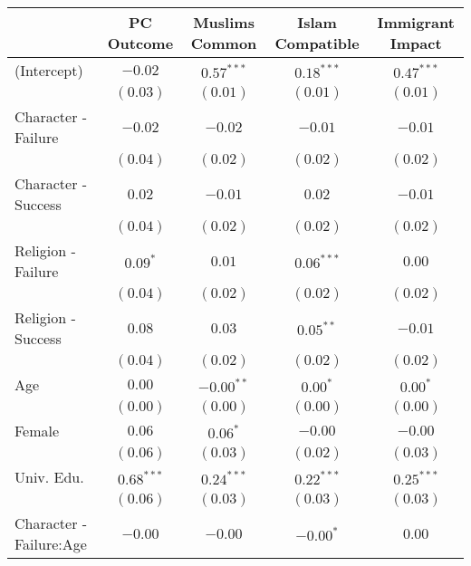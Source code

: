
\begin{table}[H]
\begin{center}
\begin{scriptsize}
\begin{tabular}{l c c c c}
\hline
 & PC Outcome & Muslims Common & Islam Compatible & Immigrant Impact \\
\hline
(Intercept)                    & $-0.02$      & $0.57^{***}$ & $0.18^{***}$ & $0.47^{***}$ \\
                               & $(0.03)$     & $(0.01)$     & $(0.01)$     & $(0.01)$     \\
Character - Failure            & $-0.02$      & $-0.02$      & $-0.01$      & $-0.01$      \\
                               & $(0.04)$     & $(0.02)$     & $(0.02)$     & $(0.02)$     \\
Character - Success            & $0.02$       & $-0.01$      & $0.02$       & $-0.01$      \\
                               & $(0.04)$     & $(0.02)$     & $(0.02)$     & $(0.02)$     \\
Religion - Failure             & $0.09^{*}$   & $0.01$       & $0.06^{***}$ & $0.00$       \\
                               & $(0.04)$     & $(0.02)$     & $(0.02)$     & $(0.02)$     \\
Religion - Success             & $0.08$       & $0.03$       & $0.05^{**}$  & $-0.01$      \\
                               & $(0.04)$     & $(0.02)$     & $(0.02)$     & $(0.02)$     \\
Age                            & $0.00$       & $-0.00^{**}$ & $0.00^{*}$   & $0.00^{*}$   \\
                               & $(0.00)$     & $(0.00)$     & $(0.00)$     & $(0.00)$     \\
Female                         & $0.06$       & $0.06^{*}$   & $-0.00$      & $-0.00$      \\
                               & $(0.06)$     & $(0.03)$     & $(0.02)$     & $(0.03)$     \\
Univ. Edu.                     & $0.68^{***}$ & $0.24^{***}$ & $0.22^{***}$ & $0.25^{***}$ \\
                               & $(0.06)$     & $(0.03)$     & $(0.03)$     & $(0.03)$     \\
Character - Failure:Age        & $-0.00$      & $-0.00$      & $-0.00^{*}$  & $0.00$       \\

\end{tabular}
\end{scriptsize}
\end{center}
\end{table}
